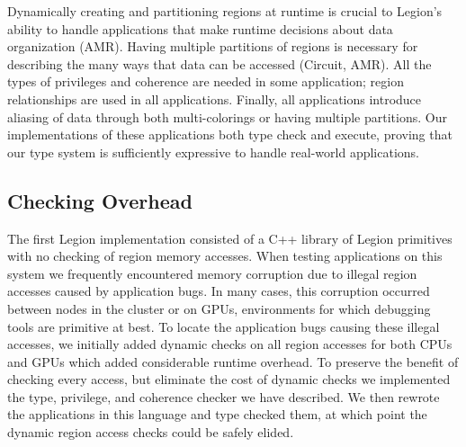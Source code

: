 Dynamically creating and partitioning regions at runtime is crucial to Legion's
ability to handle applications that make runtime decisions about data organization (AMR).  
Having multiple partitions of regions is necessary for describing the many ways 
that data can be accessed (Circuit, AMR).  All the types of privileges and coherence 
are needed in some application;  region relationships
are used in all applications.   Finally, all applications introduce aliasing of
data through both multi-colorings or having multiple partitions.  Our implementations of
these applications both type check and execute, proving that our type system is
sufficiently expressive to handle real-world applications.

\subsection{Checking Overhead}
\label{subsec:overhead}
The first Legion implementation consisted of a C++ library of Legion primitives
\cite{Legion12} with no checking of region memory accesses.  
When testing applications on this system we frequently encountered memory corruption due to
illegal region accesses caused by application bugs.
In many cases, this corruption occurred between nodes in the cluster or on 
GPUs, environments for which debugging tools are primitive at best.
To locate the application bugs causing these illegal accesses, we initially added 
dynamic checks on  all region accesses for both CPUs and GPUs which  
added considerable runtime overhead.  
To preserve the benefit of checking every access, but eliminate the cost of dynamic checks we implemented the type, privilege, and coherence checker we have described. 
We then rewrote the applications in this language and type checked them, at which point the
dynamic region access checks could be safely elided.


